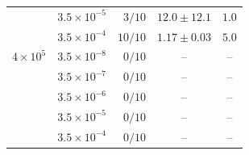 \begin{table}[htbp]
{\begin{tabular}{llrrr}
 & $3.5 \times 10^{-5}$ & $3/10$ & $12.0 \pm 12.1$ & $1.0$ \\
 & $3.5 \times 10^{-4}$ & $10/10$ & $1.17 \pm 0.03$ & $5.0$ \\
\midrule
$4 \times 10^{5}$ & $3.5 \times 10^{-8}$ & $0/10$ & \multicolumn{1}{c}{--} & \multicolumn{1}{c}{--} \\
 & $3.5 \times 10^{-7}$ & $0/10$ & \multicolumn{1}{c}{--} & \multicolumn{1}{c}{--} \\
 & $3.5 \times 10^{-6}$ & $0/10$ & \multicolumn{1}{c}{--} & \multicolumn{1}{c}{--} \\
 & $3.5 \times 10^{-5}$ & $0/10$ & \multicolumn{1}{c}{--} & \multicolumn{1}{c}{--} \\
 & $3.5 \times 10^{-4}$ & $0/10$ & \multicolumn{1}{c}{--} & \multicolumn{1}{c}{--} \\
\bottomrule
\end{tabular}
}
\end{table}
